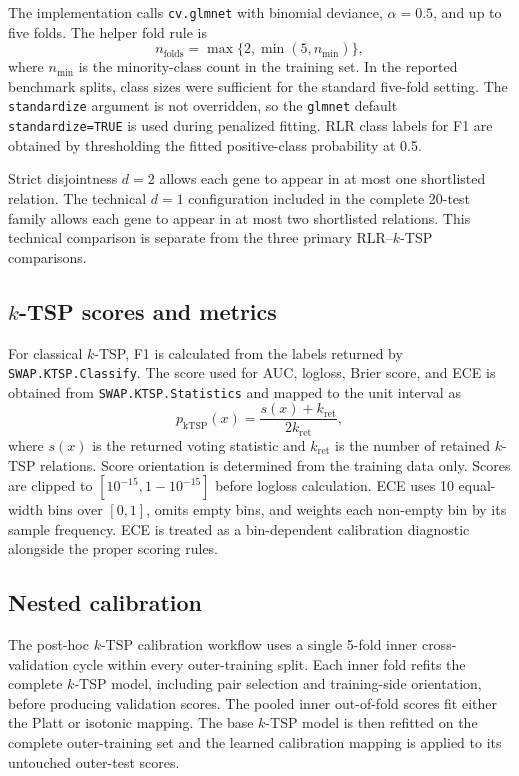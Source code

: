 \documentclass[11pt, a4paper]{article}
\begin{document}
The implementation calls \texttt{cv.glmnet} with binomial deviance, $\alpha=0.5$, and up to five folds. The helper fold rule is
\[
n_{\mathrm{folds}}=\max\{2,\min(5,n_{\min})\},
\]
where $n_{\min}$ is the minority-class count in the training set. In the reported benchmark splits, class sizes were sufficient for the standard five-fold setting. The \texttt{standardize} argument is not overridden, so the \texttt{glmnet} default \texttt{standardize=TRUE} is used during penalized fitting. RLR class labels for F1 are obtained by thresholding the fitted positive-class probability at 0.5.

Strict disjointness $d=2$ allows each gene to appear in at most one shortlisted relation. The technical $d=1$ configuration included in the complete 20-test family allows each gene to appear in at most two shortlisted relations. This technical comparison is separate from the three primary RLR--$k$-TSP comparisons.

\subsection*{$k$-TSP scores and metrics}

For classical $k$-TSP, F1 is calculated from the labels returned by \texttt{SWAP.KTSP.Classify}. The score used for AUC, logloss, Brier score, and ECE is obtained from \texttt{SWAP.KTSP.Statistics} and mapped to the unit interval as
\[
p_{\mathrm{kTSP}}(x)
=
\frac{s(x)+k_{\mathrm{ret}}}{2k_{\mathrm{ret}}},
\]
where $s(x)$ is the returned voting statistic and $k_{\mathrm{ret}}$ is the number of retained $k$-TSP relations. Score orientation is determined from the training data only. Scores are clipped to $[10^{-15},1-10^{-15}]$ before logloss calculation. ECE uses 10 equal-width bins over $[0,1]$, omits empty bins, and weights each non-empty bin by its sample frequency. ECE is treated as a bin-dependent calibration diagnostic alongside the proper scoring rules.

\subsection*{Nested calibration}

The post-hoc $k$-TSP calibration workflow uses a single 5-fold inner cross-validation cycle within every outer-training split. Each inner fold refits the complete $k$-TSP model, including pair selection and training-side orientation, before producing validation scores. The pooled inner out-of-fold scores fit either the Platt or isotonic mapping. The base $k$-TSP model is then refitted on the complete outer-training set and the learned calibration mapping is applied to its untouched outer-test scores.
\end{document}
